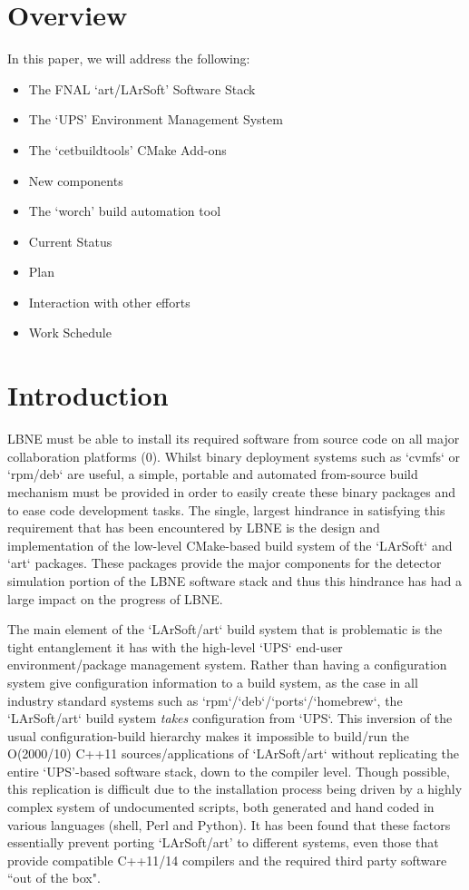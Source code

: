 \documentclass[usletter]{article}
\begin{document}
\section{Overview}

In this paper, we will address the following:
\begin{itemize}

	\item The FNAL `art/LArSoft' Software Stack
	\item The `UPS' Environment Management System
	\item The `cetbuildtools' CMake Add-ons
	\item New components
	\item The `worch' build automation tool
	\item Current Status
	\item Plan
	\item Interaction with other efforts
	\item Work Schedule

\end{itemize}

\section{Introduction}
LBNE must be able to install its required software from source code on
all major collaboration platforms (0). Whilst binary deployment systems such as
`cvmfs` or `rpm/deb` are useful, a simple, portable and automated from-source build mechanism must
be provided in order to easily create these binary packages and to ease
code development tasks. The single, largest hindrance in
satisfying this requirement that has been encountered by LBNE is the design and implementation of the low-level
CMake-based build system of the `LArSoft` and `art` packages.  These packages provide
the major components for the detector simulation portion of the LBNE software
stack and thus this hindrance has had a large impact on the progress of LBNE.

The main element of the `LArSoft/art` build system that is problematic
is the tight entanglement it has with the high-level `UPS` end-user
environment/package management system. Rather than having a configuration system
give configuration information to a build system, as the case in all industry
standard systems such as `rpm`/`deb`/`ports`/`homebrew`, the `LArSoft/art`
build system \textit{takes} configuration from `UPS`. This inversion of the usual
configuration-build hierarchy makes it impossible to build/run
the O(2000/10) C++11 sources/applications of `LArSoft/art`
without replicating the entire `UPS'-based software stack, down to the compiler
level. Though possible, this replication is difficult due to the installation
process being driven by a highly complex system of undocumented scripts, both
generated and hand coded in various languages (shell, Perl and Python).
It has been found that these factors essentially prevent porting `LArSoft/art'
to different systems, even those that provide compatible C++11/14 compilers
and the required third party software ``out of the box".
\end{document}
